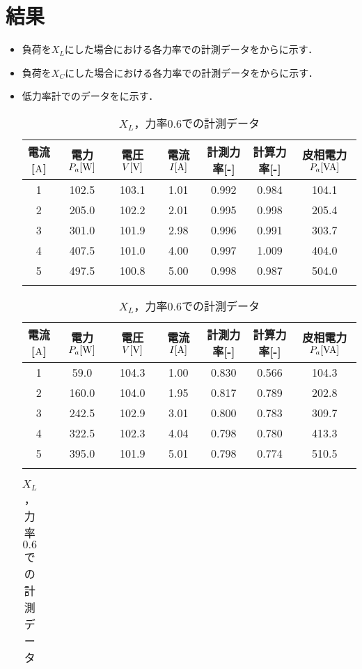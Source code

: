 \clearpage
\section{結果}
\begin{itemize}
	\item 負荷を$X_{L}$にした場合における各力率での計測データをからに示す．
	\item 負荷を$X_{C}$にした場合における各力率での計測データを\wtab{}から\wtab{}に示す．
	\item 低力率計でのデータを\wtab{}に示す．
\begin{table}[h]
	\centering
	\caption{$X_{L}$，力率$1.0$での計測データ}
	\label{tab:1data}
\begin{tabular}{ccccccc}
	\hline
	電流[$\rm{A}$] & 電力$P_a[\rm{W}]$ & 電圧$V[\rm{V}]$ & 電流$I[\rm{A}]$ & 計測力率[\rm{-}]  & 計算力率[-]  & 皮相電力$P_a[\rm{VA}]$ \\ \hline
	1            & 102.5   & 103.1   & 1.01  & 0.992 & 0.984 & 104.1   \\
	2            & 205.0   & 102.2   & 2.01  & 0.995 & 0.998 & 205.4   \\
	3            & 301.0   & 101.9   & 2.98  & 0.996 & 0.991 & 303.7   \\
	4            & 407.5   & 101.0         & 4.00  & 0.997 & 1.009 & 404.0   \\
	5            & 497.5   & 100.8         & 5.00  & 0.998 & 0.987 & 504.0     \\ \hline\\
\end{tabular}
	\caption{$X_{L}$，力率$0.8$での計測データ}
	\label{tab:0.8data}
\begin{tabular}{ccccccc}
	\hline
	電流[$\rm{A}$] & 電力$P_a[\rm{W}]$ & 電圧$V[\rm{V}]$ & 電流$I[\rm{A}]$ & 計測力率[-] & 計算力率[-] & 皮相電力$P_a[\rm{VA}]$ \\ \hline
	1 & 59.0  & 104.3 & 1.00 & 0.830 & 0.566 & 104.3 \\
	2 & 160.0 & 104.0 & 1.95 & 0.817 & 0.789 & 202.8 \\
	3 & 242.5 & 102.9 & 3.01 & 0.800 & 0.783 & 309.7 \\
	4 & 322.5 & 102.3 & 4.04 & 0.798 & 0.780 & 413.3 \\
	5 & 395.0 & 101.9 & 5.01 & 0.798 & 0.774 & 510.5 \\ \hline\\
\end{tabular}
	\caption{$X_{L}$，力率$0.6$での計測データ}
	\label{tab:0.6data}
\begin{tabular}{ccccccc}

\end{tabular}
\end{table}
\end{itemize}
